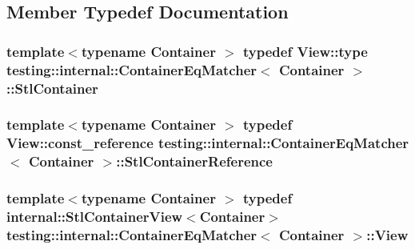 \subsection{Member Typedef Documentation}
\subsubsection[{\texorpdfstring{Stl\+Container}{StlContainer}}]{\setlength{\rightskip}{0pt plus 5cm}template$<$typename Container $>$ typedef {\bf View\+::type} {\bf testing\+::internal\+::\+Container\+Eq\+Matcher}$<$ Container $>$\+::{\bf Stl\+Container}}\hypertarget{classtesting_1_1internal_1_1ContainerEqMatcher_a8352d0190c372578d9a9a8457e0810db}{}\label{classtesting_1_1internal_1_1ContainerEqMatcher_a8352d0190c372578d9a9a8457e0810db}
\subsubsection[{\texorpdfstring{Stl\+Container\+Reference}{StlContainerReference}}]{\setlength{\rightskip}{0pt plus 5cm}template$<$typename Container $>$ typedef {\bf View\+::const\+\_\+reference} {\bf testing\+::internal\+::\+Container\+Eq\+Matcher}$<$ Container $>$\+::{\bf Stl\+Container\+Reference}}\hypertarget{classtesting_1_1internal_1_1ContainerEqMatcher_aaaeaacf0c557fe701a83e108d47edb23}{}\label{classtesting_1_1internal_1_1ContainerEqMatcher_aaaeaacf0c557fe701a83e108d47edb23}
\subsubsection[{\texorpdfstring{View}{View}}]{\setlength{\rightskip}{0pt plus 5cm}template$<$typename Container $>$ typedef {\bf internal\+::\+Stl\+Container\+View}$<$Container$>$ {\bf testing\+::internal\+::\+Container\+Eq\+Matcher}$<$ Container $>$\+::{\bf View}}\hypertarget{classtesting_1_1internal_1_1ContainerEqMatcher_a1565779cdc3d617fcdc8293f9b53c2a6}{}\label{classtesting_1_1internal_1_1ContainerEqMatcher_a1565779cdc3d617fcdc8293f9b53c2a6}


